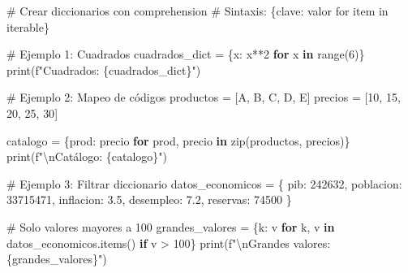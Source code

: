 \documentclass[
  doc,
  floatsintext,
  longtable,
  a4paper,
  nolmodern,
  notxfonts,
  notimes,
  12pt,
  colorlinks=true,linkcolor=blue,citecolor=blue,urlcolor=blue]{apa7}
\newenvironment{Shaded}{\begin{snugshade}}{\end{snugshade}}
\newcommand{\BuiltInTok}[1]{\textcolor[rgb]{0.00,0.23,0.31}{#1}}
\newcommand{\CharTok}[1]{\textcolor[rgb]{0.13,0.47,0.30}{#1}}
\newcommand{\CommentTok}[1]{\textcolor[rgb]{0.37,0.37,0.37}{#1}}
\newcommand{\ControlFlowTok}[1]{\textcolor[rgb]{0.00,0.23,0.31}{\textbf{#1}}}
\newcommand{\DecValTok}[1]{\textcolor[rgb]{0.68,0.00,0.00}{#1}}
\newcommand{\FloatTok}[1]{\textcolor[rgb]{0.68,0.00,0.00}{#1}}
\newcommand{\KeywordTok}[1]{\textcolor[rgb]{0.00,0.23,0.31}{\textbf{#1}}}
\newcommand{\NormalTok}[1]{\textcolor[rgb]{0.00,0.23,0.31}{#1}}
\newcommand{\OperatorTok}[1]{\textcolor[rgb]{0.37,0.37,0.37}{#1}}
\newcommand{\SpecialCharTok}[1]{\textcolor[rgb]{0.37,0.37,0.37}{#1}}
\newcommand{\SpecialStringTok}[1]{\textcolor[rgb]{0.13,0.47,0.30}{#1}}
\newcommand{\StringTok}[1]{\textcolor[rgb]{0.13,0.47,0.30}{#1}}
\begin{document}
\begin{Shaded}
\begin{Highlighting}[]
\CommentTok{\# Crear diccionarios con comprehension}
\CommentTok{\# Sintaxis: \{clave: valor for item in iterable\}}

\CommentTok{\# Ejemplo 1: Cuadrados}
\NormalTok{cuadrados\_dict }\OperatorTok{=}\NormalTok{ \{x: x}\OperatorTok{**}\DecValTok{2} \ControlFlowTok{for}\NormalTok{ x }\KeywordTok{in} \BuiltInTok{range}\NormalTok{(}\DecValTok{6}\NormalTok{)\}}
\BuiltInTok{print}\NormalTok{(}\SpecialStringTok{f"Cuadrados: }\SpecialCharTok{\{}\NormalTok{cuadrados\_dict}\SpecialCharTok{\}}\SpecialStringTok{"}\NormalTok{)}

\CommentTok{\# Ejemplo 2: Mapeo de códigos}
\NormalTok{productos }\OperatorTok{=}\NormalTok{ [}\StringTok{\textquotesingle{}A\textquotesingle{}}\NormalTok{, }\StringTok{\textquotesingle{}B\textquotesingle{}}\NormalTok{, }\StringTok{\textquotesingle{}C\textquotesingle{}}\NormalTok{, }\StringTok{\textquotesingle{}D\textquotesingle{}}\NormalTok{, }\StringTok{\textquotesingle{}E\textquotesingle{}}\NormalTok{]}
\NormalTok{precios }\OperatorTok{=}\NormalTok{ [}\DecValTok{10}\NormalTok{, }\DecValTok{15}\NormalTok{, }\DecValTok{20}\NormalTok{, }\DecValTok{25}\NormalTok{, }\DecValTok{30}\NormalTok{]}

\NormalTok{catalogo }\OperatorTok{=}\NormalTok{ \{prod: precio }\ControlFlowTok{for}\NormalTok{ prod, precio }\KeywordTok{in} \BuiltInTok{zip}\NormalTok{(productos, precios)\}}
\BuiltInTok{print}\NormalTok{(}\SpecialStringTok{f"}\CharTok{\textbackslash{}n}\SpecialStringTok{Catálogo: }\SpecialCharTok{\{}\NormalTok{catalogo}\SpecialCharTok{\}}\SpecialStringTok{"}\NormalTok{)}

\CommentTok{\# Ejemplo 3: Filtrar diccionario}
\NormalTok{datos\_economicos }\OperatorTok{=}\NormalTok{ \{}
    \StringTok{\textquotesingle{}pib\textquotesingle{}}\NormalTok{: }\DecValTok{242632}\NormalTok{,}
    \StringTok{\textquotesingle{}poblacion\textquotesingle{}}\NormalTok{: }\DecValTok{33715471}\NormalTok{,}
    \StringTok{\textquotesingle{}inflacion\textquotesingle{}}\NormalTok{: }\FloatTok{3.5}\NormalTok{,}
    \StringTok{\textquotesingle{}desempleo\textquotesingle{}}\NormalTok{: }\FloatTok{7.2}\NormalTok{,}
    \StringTok{\textquotesingle{}reservas\textquotesingle{}}\NormalTok{: }\DecValTok{74500}
\NormalTok{\}}

\CommentTok{\# Solo valores mayores a 100}
\NormalTok{grandes\_valores }\OperatorTok{=}\NormalTok{ \{k: v }\ControlFlowTok{for}\NormalTok{ k, v }\KeywordTok{in}\NormalTok{ datos\_economicos.items() }\ControlFlowTok{if}\NormalTok{ v }\OperatorTok{\textgreater{}} \DecValTok{100}\NormalTok{\}}
\BuiltInTok{print}\NormalTok{(}\SpecialStringTok{f"}\CharTok{\textbackslash{}n}\SpecialStringTok{Grandes valores: }\SpecialCharTok{\{}\NormalTok{grandes\_valores}\SpecialCharTok{\}}\SpecialStringTok{"}\NormalTok{)}
\end{Highlighting}
\end{Shaded}
\end{document}
